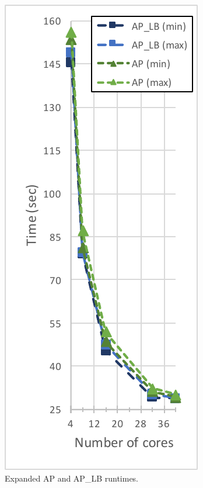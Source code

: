 \documentclass[11pt]{elsarticle}
\begin{document}
\begin{figure}
\centering
\includegraphics[width=.5\textwidth]{zoomedapaplb}
\caption{Expanded AP and AP\_LB runtimes.}
\end{figure}
\end{document}
